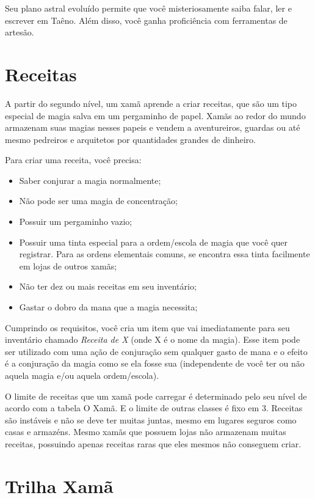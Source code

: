 \begin{multicols}{2}
Seu plano astral evoluído permite que você misteriosamente saiba falar, ler e
escrever em Taêno. Além disso, você ganha proficiência com ferramentas de
artesão.

\section*{Receitas}%

A partir do segundo nível, um xamã aprende a criar receitas, que são um tipo
especial de magia salva em um pergaminho de papel. Xamãs ao redor do mundo
armazenam suas magias nesses papeis e vendem a aventureiros, guardas ou até
mesmo pedreiros e arquitetos por quantidades grandes de dinheiro.

Para criar uma receita, você precisa:
\begin{itemize}
    \item Saber conjurar a magia normalmente;
    \item Não pode ser uma magia de concentração;
    \item Possuir um pergaminho vazio;
    \item Possuir uma tinta especial para a ordem/escola de magia que você
            quer registrar. Para as ordens elementais comuns, se encontra essa tinta
        facilmente em lojas de outros xamãs;
    \item Não ter dez ou mais receitas em seu inventário;
    \item Gastar o dobro da mana que a magia necessita;
\end{itemize}

Cumprindo os requisitos, você cria um item que vai imediatamente para seu
inventário chamado \textit{Receita de X} (onde X é o nome da magia). Esse item
pode ser utilizado com uma ação de conjuração sem qualquer gasto de mana e o
efeito é a conjuração da magia como se ela fosse sua (independente de você ter
ou não aquela magia e/ou aquela ordem/escola).

O limite de receitas que um xamã pode carregar é determinado pelo seu nível de
acordo com a tabela O Xamã. E o limite de outras classes é fixo em 3. Receitas
são instáveis e não se deve ter muitas juntas, mesmo em lugares seguros como
casas e armazéns. Mesmo xamãs que possuem lojas não armazenam muitas receitas,
possuindo apenas receitas raras que eles mesmos não conseguem criar.

\section*{Trilha Xamã}


\end{multicols}
